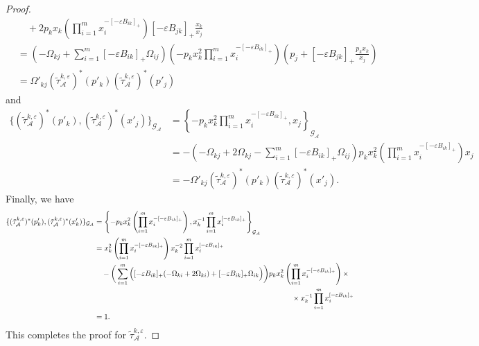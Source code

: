 \documentclass{amsart}
\numberwithin{equation}{section}
\newcommand{\cA}{\mathcal{A}}
\newcommand{\cG}{\mathcal{G}}
\begin{document}
\begin{proof}
\begin{align*}
    &\quad + 2 p_k x_k \left(\prod\limits_{i=1}^m x_i^{-[-\varepsilon B_{ik}]_+}\right) [-\varepsilon B_{jk}]_+ \frac{x_k}{x_j}\\
    &=(-\Omega_{kj} + \sum\limits_{i=1}^m [-\varepsilon B_{ik}]_+ \Omega_{ij}) (-p_k x_k^2 \prod\limits_{i=1}^m x_i^{-[-\varepsilon B_{ik}]_+}) (p_j + [-\varepsilon B_{jk}]_+ \frac{p_k x_k}{x_j})\\
    &=\Omega'_{kj}(\tilde\tau_\cA^{k,\varepsilon})^*(p'_k) (\tilde\tau_\cA^{k,\varepsilon})^*(p'_j)
  \end{align*}
  and
  \begin{align*}
    \{(\tilde\tau_\cA^{k,\varepsilon})^*(p'_k),(\tilde\tau_\cA^{k,\varepsilon})^*(x'_j)\}_{\cG_\cA}
    &=\left\{-p_k x_k^2 \prod\limits_{i=1}^m x_i^{-[-\varepsilon B_{ik}]_+},x_j\right\}_{\cG_\cA}\\
    &= -(-\Omega_{kj} + 2\Omega_{kj} - \sum\limits_{i=1}^m [-\varepsilon B_{ik}]_+ \Omega_{ij}) p_k x_k^2\left(\prod\limits_{i=1}^m x_i^{-[-\varepsilon B_{ik}]_+}\right)x_j\\
    &= -\Omega'_{kj}(\tilde\tau_\cA^{k,\varepsilon})^*(p'_k) (\tilde\tau_\cA^{k,\varepsilon})^*(x'_j).
  \end{align*}
  Finally, we have
  \begin{align*}
    \{(\tilde\tau_\cA^{k,\varepsilon})^*(p'_k),(\tilde\tau_\cA^{k,\varepsilon})^*(x'_k)\}_{\cG_\cA}
    &=\left\{-p_k x_k^2\left(\prod\limits_{i=1}^m x_i^{-[-\varepsilon B_{ik}]_+}\right),x_k^{-1}\prod\limits_{i=1}^m x_i^{[-\varepsilon B_{ik}]_+}\right\}_{\cG_\cA}\\
    &=x_k^2\left(\prod\limits_{i=1}^m x_i^{-[-\varepsilon B_{ik}]_+}\right)x_k^{-2}\prod\limits_{i=1}^m x_i^{[-\varepsilon B_{ik}]_+}\\
    &\quad -\bigg(\sum\limits_{i=1}^m \Big([-\varepsilon B_{ik}]_+ (-\Omega_{ki} + 2\Omega_{ki}) + [-\varepsilon B_{ik}]_+ \Omega_{ik}\Big) \bigg) p_k x_k^2 \left(\prod\limits_{i=1}^m x_i^{-[-\varepsilon B_{ik}]_+}\right)\times\\
    &\hspace{3.7in}\times x_k^{-1}\prod\limits_{i=1}^m x_i^{[-\varepsilon B_{ik}]_+}\\
    &=1.
  \end{align*}
  This completes the proof for $\tilde\tau_\cA^{k,\varepsilon}$.
\end{proof}
\end{document}
